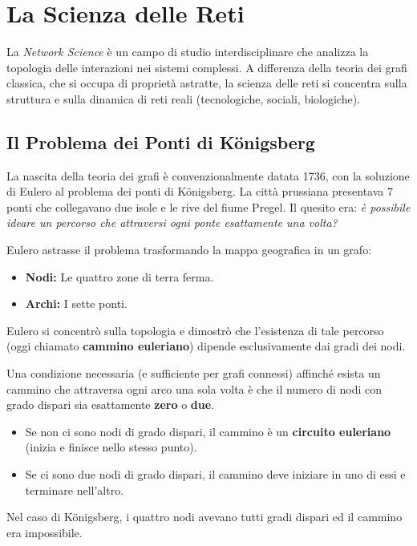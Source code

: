 \section{La Scienza delle Reti}
\label{chap:network_science}

La \textit{Network Science} è un campo di studio interdisciplinare che analizza la topologia delle interazioni nei sistemi complessi. A differenza della teoria dei grafi classica, che si occupa di proprietà astratte, la scienza delle reti si concentra sulla struttura e sulla dinamica di reti reali (tecnologiche, sociali, biologiche).

\subsection{Il Problema dei Ponti di Königsberg}
La nascita della teoria dei grafi è convenzionalmente datata 1736, con la soluzione di Eulero al problema dei ponti di Königsberg. La città prussiana presentava 7 ponti che collegavano due isole e le rive del fiume Pregel. Il quesito era: \textit{è possibile ideare un percorso che attraversi ogni ponte esattamente una volta?}

Eulero astrasse il problema trasformando la mappa geografica in un grafo:
\begin{itemize}
    \item \textbf{Nodi:} Le quattro zone di terra ferma.
    \item \textbf{Archi:} I sette ponti.
\end{itemize}
Eulero si concentrò sulla topologia e dimostrò che l'esistenza di tale percorso (oggi chiamato \textbf{cammino euleriano}) dipende esclusivamente dai gradi dei nodi.

\begin{tcolorbox}[colback=colorC!15, colframe=colorC!70!colorB,  title=\textbf{Teorema di Eulero-Hierholzer}]
Una condizione necessaria (e sufficiente per grafi connessi) affinché esista un cammino che attraversa ogni arco una sola volta è che il numero di nodi con grado dispari sia esattamente \textbf{zero} o \textbf{due}.
\end{tcolorbox}
\begin{itemize}
    \item Se non ci sono nodi di grado dispari, il cammino è un \textbf{circuito euleriano} (inizia e finisce nello stesso punto).
    \item Se ci sono due nodi di grado dispari, il cammino deve iniziare in uno di essi e terminare nell'altro.
\end{itemize}
Nel caso di Königsberg, i quattro nodi avevano tutti gradi dispari ed il cammino era impossibile.


